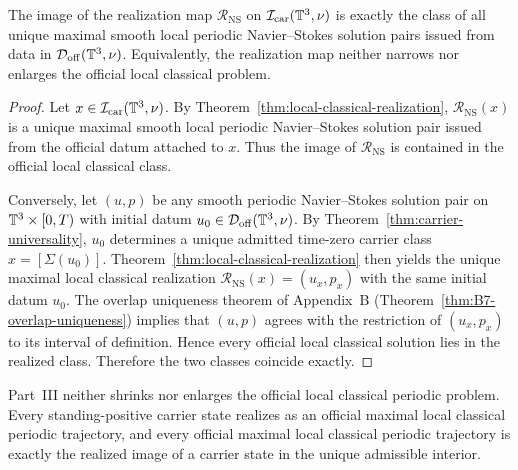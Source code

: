 \begin{theorem}\label{thm:realized-class-equals-official-local-class}
The image of the realization map $\mathcal R_{\mathrm{NS}}$ on
$\mathcal I_{\mathrm{car}}(\mathbb{T}^3,\nu)$ is exactly the class of all unique maximal smooth local periodic
Navier--Stokes solution pairs issued from data in $\mathcal D_{\mathrm{off}}(\mathbb{T}^3,\nu)$.
Equivalently, the realization map neither narrows nor enlarges the official local classical problem.
\end{theorem}

\begin{proof}
Let $x\in\mathcal I_{\mathrm{car}}(\mathbb{T}^3,\nu)$. By Theorem~\ref{thm:local-classical-realization},
$\mathcal R_{\mathrm{NS}}(x)$ is a unique maximal smooth local periodic Navier--Stokes solution pair
issued from the official datum attached to $x$. Thus the image of $\mathcal R_{\mathrm{NS}}$ is contained
in the official local classical class.

Conversely, let $(u,p)$ be any smooth periodic Navier--Stokes solution pair on
$\mathbb{T}^3\times[0,T)$ with initial datum $u_0\in\mathcal D_{\mathrm{off}}(\mathbb{T}^3,\nu)$. By
Theorem~\ref{thm:carrier-universality}, $u_0$ determines a unique admitted time-zero carrier class
$x=[\Sigma(u_0)]$. Theorem~\ref{thm:local-classical-realization} then yields the unique maximal
local classical realization $\mathcal R_{\mathrm{NS}}(x)=(u_x,p_x)$ with the same initial datum $u_0$.
The overlap uniqueness theorem of Appendix~B (Theorem~\ref{thm:B7-overlap-uniqueness}) implies that $(u,p)$ agrees with the restriction
of $(u_x,p_x)$ to its interval of definition. Hence every official local classical solution lies in the
realized class. Therefore the two classes coincide exactly.
\end{proof}

\begin{manualtheorem}
\label{thm:transport-realized-class-equals-official}
Part~III neither shrinks nor enlarges the official local classical periodic problem. Every standing-positive carrier state realizes as an official maximal local classical periodic trajectory, and every official maximal local classical periodic trajectory is exactly the realized image of a carrier state in the unique admissible interior.
\end{manualtheorem}

